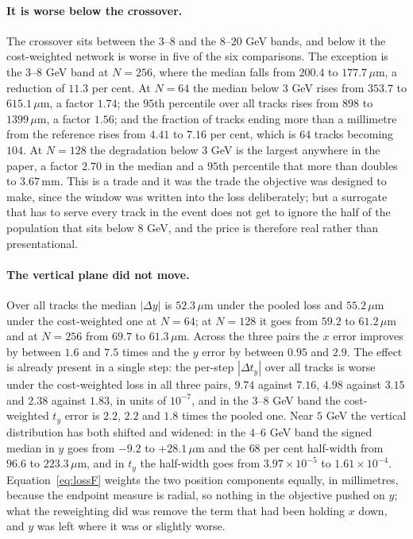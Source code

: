 \documentclass[11pt,a4paper]{article}
\newcommand{\um}{\ensuremath{\,\mu\mathrm{m}}}
\newcommand{\mm}{\ensuremath{\,\mathrm{mm}}}
\begin{document}
\paragraph{It is worse below the crossover.} The crossover sits between the
$3$--$8$ and the $8$--$20$ GeV bands, and below it the cost-weighted network is
worse in five of the six comparisons. The exception is the $3$--$8$ GeV band at
$N = 256$, where the median falls from $200.4$ to $177.7\um$, a reduction of
$11.3$ per cent. At $N = 64$ the median below
$3$ GeV rises from $353.7$ to $615.1\um$, a factor $1.74$; the $95$th
percentile over all tracks rises from $898$ to $1399\um$, a factor $1.56$; and
the fraction of tracks ending more than a millimetre from the reference rises
from $4.41$ to $7.16$ per cent, which is $64$ tracks becoming $104$. At
$N = 128$ the degradation below $3$ GeV is the largest anywhere in the paper, a
factor $2.70$ in the median and a $95$th percentile that more than doubles to
$3.67\mm$. This is a trade and it was the trade the objective was designed to
make, since the window was written into the loss deliberately; but a
surrogate that has to serve every track in the event does not get to ignore
the half of the population that sits below $8$ GeV, and the price is therefore
real rather than presentational.

\paragraph{The vertical plane did not move.} Over all tracks the median
$|\Delta y|$ is $52.3\um$ under the pooled loss and $55.2\um$ under the
cost-weighted one at $N = 64$; at $N = 128$ it goes from $59.2$ to $61.2\um$
and at $N = 256$ from $69.7$ to $61.3\um$. Across the three pairs the $x$ error
improves by between $1.6$ and $7.5$ times and the $y$ error by between $0.95$
and $2.9$. The effect is already present in a single step: the per-step
$|\Delta t_y|$ over all tracks is worse under the cost-weighted loss in all
three pairs, $9.74$ against $7.16$, $4.98$ against $3.15$ and $2.38$ against
$1.83$, in units of $10^{-7}$, and in the $3$--$8$ GeV band the cost-weighted
$t_y$ error is $2.2$, $2.2$ and $1.8$ times the pooled one. Near $5$ GeV the
vertical distribution has both shifted and widened: in the $4$--$6$ GeV band
the signed median in $y$ goes from $-9.2$ to $+28.1\um$ and the $68$ per cent
half-width from $96.6$ to $223.3\um$, and in $t_y$ the half-width goes from
$3.97\times10^{-5}$ to $1.61\times10^{-4}$. Equation~\eqref{eq:lossF} weights
the two position components equally, in millimetres, because the endpoint
measure is radial, so nothing in the objective pushed on $y$; what the
reweighting did was remove the term that had been holding $x$ down, and $y$ was
left where it was or slightly worse.
\end{document}
